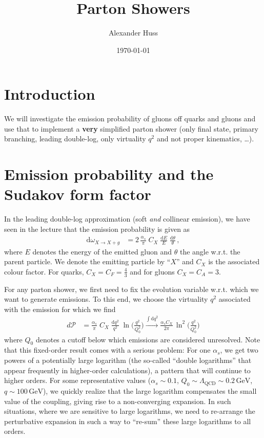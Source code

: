 \documentclass[11pt]{article}
\author{Alexander Huss}
\date{\today}
\title{Parton Showers}
\begin{document}
\maketitle
\tableofcontents



\section{Introduction}
\label{sec:orgdf5b20a}
We will investigate the emission probability of gluons off quarks and gluons and use that to implement a \textbf{very} simplified parton shower (only final state, primary branching, leading double-log, only virtuality \(q^2\) and not proper kinematics, \ldots{}).

\section{Emission probability and the Sudakov form factor}
\label{sec:org8c83906}
In the leading double-log approximation (soft \emph{and} collinear emission), we have seen in the lecture that the emission probability is given as
\begin{align}
  \mathrm{d}\omega_{X\to X+g}
  &=
  2 \, \frac{\alpha_s}{\pi}\; C_X \; \frac{\mathrm{d}E}{E} \; \frac{\mathrm{d}\theta}{\theta}
  \,,
\end{align}
where \(E\) denotes the energy of the emitted gluon and \(\theta\) the angle w.r.t. the parent particle.
We denote the emitting particle by ``\(X\)'' and \(C_X\) is the associated colour factor.
For quarks, \(C_X=C_F=\tfrac{4}{3}\) and for gluons \(C_X=C_A=3\).

For any parton shower, we first need to fix the evolution variable w.r.t. which we want to generate emissions.
To this end, we choose the virtuality \(q^2\) associated with the emission for which we find
\begin{align}
  d\mathcal{P}
  &=
  \frac{\alpha_s}{\pi}\; C_X \; \frac{\mathrm{d}q^2}{q^2} \; \ln\biggl(\frac{q^2}{Q_0^2}\biggr)
  \xrightarrow{\int\mathrm{d}q^2}
  \frac{\alpha_s C_X}{2\pi} \, \ln^2\biggl(\frac{q^2}{Q_0^2}\biggr)
\end{align}
where \(Q_0\) denotes a cutoff below which emissions are considered unresolved.
Note that this fixed-order result comes with a serious problem: For one \(\alpha_s\), we get two powers of a potentially large logarithm (the so-called ``double logarithms'' that appear frequently in higher-order calculations), a pattern that will continue to higher orders.
For some representative values (\(\alpha_s \sim 0.1\), \(Q_0 \sim \Lambda_\mathrm{QCD} \sim 0.2\,\mathrm{GeV}\), \(q\sim 100\,\mathrm{GeV}\)), we quickly realize that the large logarithm compensates the small value of the coupling, giving rise to a non-converging expansion.
In such situations, where we are sensitive to large logarithms, we need to re-arrange the perturbative expansion in such a way to ``re-sum'' these large logarithms to all orders.
\end{document}
